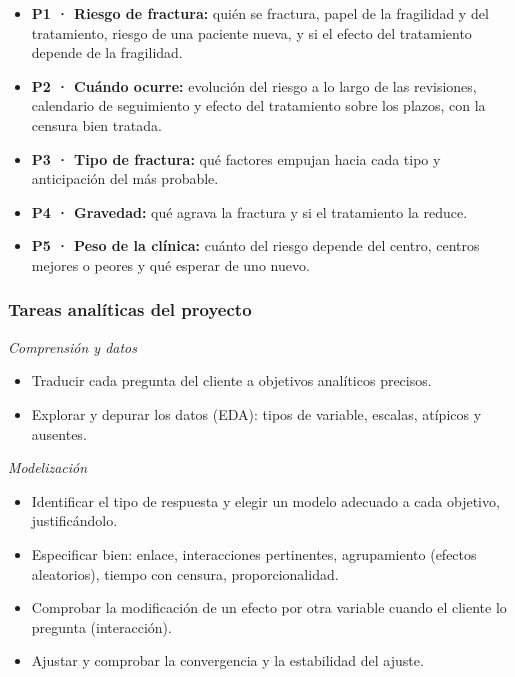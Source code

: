 \documentclass[
  letterpaper,
  DIV=11,
  numbers=noendperiod]{scrartcl}
\providecommand{\tightlist}{%
  \setlength{\itemsep}{0pt}\setlength{\parskip}{0pt}}\usepackage{longtable,booktabs,array}
\begin{document}
\begin{itemize}
\tightlist
\item[$\square$]
  \textbf{P1 · Riesgo de fractura:} quién se fractura, papel de la
  fragilidad y del tratamiento, riesgo de una paciente nueva, y si el
  efecto del tratamiento depende de la fragilidad.
\item[$\square$]
  \textbf{P2 · Cuándo ocurre:} evolución del riesgo a lo largo de las
  revisiones, calendario de seguimiento y efecto del tratamiento sobre
  los plazos, con la censura bien tratada.
\item[$\square$]
  \textbf{P3 · Tipo de fractura:} qué factores empujan hacia cada tipo y
  anticipación del más probable.
\item[$\square$]
  \textbf{P4 · Gravedad:} qué agrava la fractura y si el tratamiento la
  reduce.
\item[$\square$]
  \textbf{P5 · Peso de la clínica:} cuánto del riesgo depende del
  centro, centros mejores o peores y qué esperar de uno nuevo.
\end{itemize}

\hypertarget{tareas-analuxedticas-del-proyecto}{%
\subsubsection{Tareas analíticas del
proyecto}\label{tareas-analuxedticas-del-proyecto}}

\emph{Comprensión y datos}

\begin{itemize}
\tightlist
\item[$\square$]
  Traducir cada pregunta del cliente a objetivos analíticos precisos.
\item[$\square$]
  Explorar y depurar los datos (EDA): tipos de variable, escalas,
  atípicos y ausentes.
\end{itemize}

\emph{Modelización}

\begin{itemize}
\tightlist
\item[$\square$]
  Identificar el tipo de respuesta y elegir un modelo adecuado a cada
  objetivo, justificándolo.
\item[$\square$]
  Especificar bien: enlace, interacciones pertinentes, agrupamiento
  (efectos aleatorios), tiempo con censura, proporcionalidad.
\item[$\square$]
  Comprobar la modificación de un efecto por otra variable cuando el
  cliente lo pregunta (interacción).
\item[$\square$]
  Ajustar y comprobar la convergencia y la estabilidad del ajuste.
\end{itemize}
\end{document}
